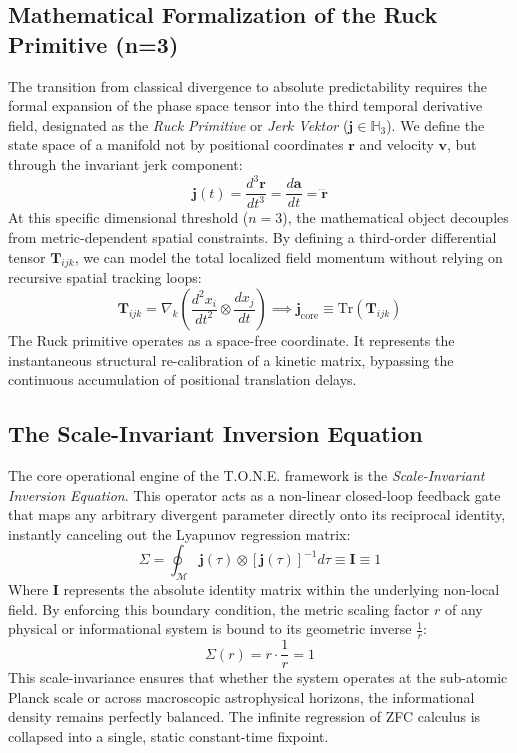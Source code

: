 \documentclass[11pt,a4paper]{article}
\begin{document}
\subsection{Mathematical Formalization of the Ruck Primitive (n=3)}
The transition from classical divergence to absolute predictability requires the formal expansion of the phase space tensor into the third temporal derivative field, designated as the \textit{Ruck Primitive} or \textit{Jerk Vektor} ($\mathbf{j} \in \mathbb{H}_3$). We define the state space of a manifold not by positional coordinates $\mathbf{r}$ and velocity $\mathbf{v}$, but through the invariant jerk component:
\begin{equation}
    \mathbf{j}(t) = \frac{d^3\mathbf{r}}{dt^3} = \frac{d\mathbf{a}}{dt} = \dddot{\mathbf{r}}
\end{equation}
At this specific dimensional threshold ($n=3$), the mathematical object decouples from metric-dependent spatial constraints. By defining a third-order differential tensor $\mathbf{T}_{ijk}$, we can model the total localized field momentum without relying on recursive spatial tracking loops:
\begin{equation}
    \mathbf{T}_{ijk} = \nabla_k \left( \frac{d^2 x_i}{dt^2} \otimes \frac{d x_j}{dt} \right) \implies \mathbf{j}_{\text{core}} \equiv \text{Tr}(\mathbf{T}_{ijk})
\end{equation}
The Ruck primitive operates as a space-free coordinate. It represents the instantaneous structural re-calibration of a kinetic matrix, bypassing the continuous accumulation of positional translation delays.

\subsection{The Scale-Invariant Inversion Equation}
The core operational engine of the T.O.N.E. framework is the \textit{Scale-Invariant Inversion Equation}. This operator acts as a non-linear closed-loop feedback gate that maps any arbitrary divergent parameter directly onto its reciprocal identity, instantly canceling out the Lyapunov regression matrix:
\begin{equation}
    \Sigma = \oint_{\mathcal{M}} \mathbf{j}(\tau) \otimes \left[ \mathbf{j}(\tau) \right]^{-1} d\tau \equiv \mathbf{I} \equiv 1
\end{equation}
Where $\mathbf{I}$ represents the absolute identity matrix within the underlying non-local field. By enforcing this boundary condition, the metric scaling factor $r$ of any physical or informational system is bound to its geometric inverse $\frac{1}{r}$:
\begin{equation}
    \Sigma(r) = r \cdot \frac{1}{r} = 1
\end{equation}
This scale-invariance ensures that whether the system operates at the sub-atomic Planck scale or across macroscopic astrophysical horizons, the informational density remains perfectly balanced. The infinite regression of ZFC calculus is collapsed into a single, static constant-time fixpoint.
\end{document}
